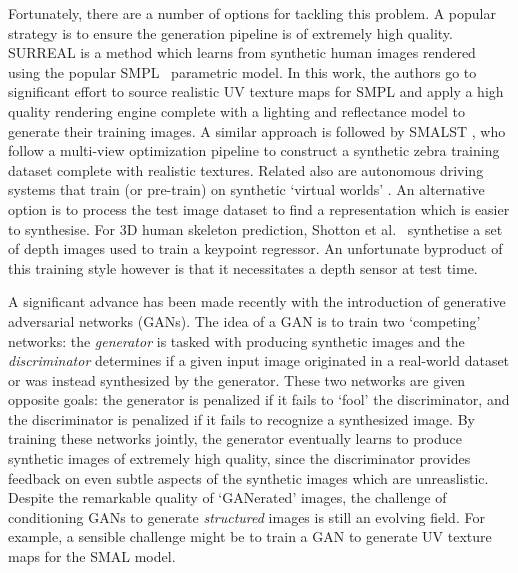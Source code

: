     Fortunately, there are a number of options for tackling this problem. A popular strategy is to ensure the generation pipeline is of extremely high quality. SURREAL is a method which learns from synthetic human images rendered using the popular SMPL~\cite{loper15smpl} parametric model. In this work, the authors go to significant effort to source realistic UV texture maps for SMPL and apply a high quality rendering engine complete with a lighting and reflectance model to generate their training images. A similar approach is followed by SMALST , who follow a multi-view optimization pipeline to construct a synthetic zebra training dataset complete with realistic textures. Related also are autonomous driving systems that train (or pre-train) on synthetic `virtual worlds' . An alternative option is to process the test image dataset to find a representation which is easier to synthesise. For 3D human skeleton prediction, Shotton et al.~\cite{shotton-kinect} synthetise a set of depth images used to train a keypoint regressor. An unfortunate byproduct of this training style however is that it necessitates a depth sensor at test time. 


    A significant advance has been made recently with the introduction of generative adversarial networks (GANs). The idea of a GAN is to train two `competing' networks: the \emph{generator} is tasked with producing synthetic images and the \emph{discriminator} determines if a given input image originated in a real-world dataset or was instead synthesized by the generator. These two networks are given opposite goals: the generator is penalized if it fails to `fool' the discriminator, and the discriminator is penalized if it fails to recognize a synthesized image. By training these networks jointly, the generator eventually learns to produce synthetic images of extremely high quality, since the discriminator provides feedback on even subtle aspects of the synthetic images which are unreaslistic. Despite the remarkable quality of `GANerated' images, the challenge of conditioning GANs to generate \emph{structured} images is still an evolving field. For example, a sensible challenge might be to train a GAN to generate UV texture maps for the SMAL model. 
    

